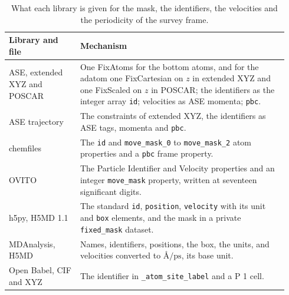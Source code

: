 \documentclass[preprint,12pt]{elsarticle}
\begin{document}
\begin{table}[tbp] \centering \small \caption{What each library is given for the mask, the identifiers, the velocities and the periodicity of the survey frame.}
\label{tab:mechanisms}
\begin{tabular}{@{}p{0.24\linewidth}p{0.70\linewidth}@{}}
\toprule
Library and file & Mechanism \\
\midrule
ASE, extended XYZ and POSCAR & One FixAtoms for the bottom atoms, and for the adatom one FixCartesian on \(z\) in extended XYZ and one FixScaled on \(z\) in POSCAR; the identifiers as the integer array \texttt{id}; velocities as ASE momenta; \texttt{pbc}. \\
ASE trajectory & The constraints of extended XYZ, the identifiers as ASE tags, momenta and \texttt{pbc}. \\
chemfiles & The \texttt{id} and \texttt{move\_mask\_0} to \texttt{move\_mask\_2} atom properties and a \texttt{pbc} frame property. \\
OVITO & The Particle Identifier and Velocity properties and an integer \texttt{move\_mask} property, written at seventeen significant digits. \\
h5py, H5MD 1.1 & The standard \texttt{id}, \texttt{position}, \texttt{velocity} with its unit and \texttt{box} elements, and the mask in a private \texttt{fixed\_mask} dataset. \\
MDAnalysis, H5MD & Names, identifiers, positions, the box, the units, and velocities converted to \(\text{\AA}/\mathrm{ps}\), its base unit. \\
Open Babel, CIF and XYZ & The identifier in \texttt{\_atom\_site\_label} and a P 1 cell. \\
\bottomrule
\end{tabular}
\end{table}
\end{document}
